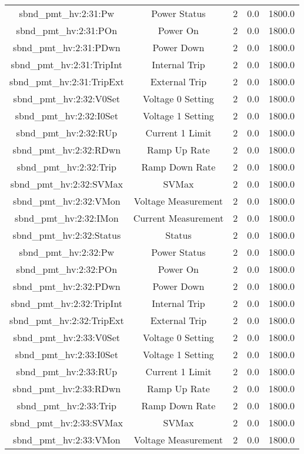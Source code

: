 \begin{table}[ptb]
\begin{tabular}{c | c c c c}
sbnd_pmt_hv:2:31:Pw & Power Status & 2 & 0.0 & 1800.0\\ 
sbnd_pmt_hv:2:31:POn & Power On & 2 & 0.0 & 1800.0\\ 
sbnd_pmt_hv:2:31:PDwn & Power Down & 2 & 0.0 & 1800.0\\ 
sbnd_pmt_hv:2:31:TripInt & Internal Trip & 2 & 0.0 & 1800.0\\ 
sbnd_pmt_hv:2:31:TripExt & External Trip & 2 & 0.0 & 1800.0\\ 
sbnd_pmt_hv:2:32:V0Set & Voltage 0 Setting & 2 & 0.0 & 1800.0\\ 
sbnd_pmt_hv:2:32:I0Set & Voltage 1 Setting & 2 & 0.0 & 1800.0\\ 
sbnd_pmt_hv:2:32:RUp & Current 1 Limit & 2 & 0.0 & 1800.0\\ 
sbnd_pmt_hv:2:32:RDwn & Ramp Up Rate & 2 & 0.0 & 1800.0\\ 
sbnd_pmt_hv:2:32:Trip & Ramp Down Rate & 2 & 0.0 & 1800.0\\ 
sbnd_pmt_hv:2:32:SVMax & SVMax & 2 & 0.0 & 1800.0\\ 
sbnd_pmt_hv:2:32:VMon & Voltage Measurement & 2 & 0.0 & 1800.0\\ 
sbnd_pmt_hv:2:32:IMon & Current Measurement & 2 & 0.0 & 1800.0\\ 
sbnd_pmt_hv:2:32:Status & Status & 2 & 0.0 & 1800.0\\ 
sbnd_pmt_hv:2:32:Pw & Power Status & 2 & 0.0 & 1800.0\\ 
sbnd_pmt_hv:2:32:POn & Power On & 2 & 0.0 & 1800.0\\ 
sbnd_pmt_hv:2:32:PDwn & Power Down & 2 & 0.0 & 1800.0\\ 
sbnd_pmt_hv:2:32:TripInt & Internal Trip & 2 & 0.0 & 1800.0\\ 
sbnd_pmt_hv:2:32:TripExt & External Trip & 2 & 0.0 & 1800.0\\ 
sbnd_pmt_hv:2:33:V0Set & Voltage 0 Setting & 2 & 0.0 & 1800.0\\ 
sbnd_pmt_hv:2:33:I0Set & Voltage 1 Setting & 2 & 0.0 & 1800.0\\ 
sbnd_pmt_hv:2:33:RUp & Current 1 Limit & 2 & 0.0 & 1800.0\\ 
sbnd_pmt_hv:2:33:RDwn & Ramp Up Rate & 2 & 0.0 & 1800.0\\ 
sbnd_pmt_hv:2:33:Trip & Ramp Down Rate & 2 & 0.0 & 1800.0\\ 
sbnd_pmt_hv:2:33:SVMax & SVMax & 2 & 0.0 & 1800.0\\ 
sbnd_pmt_hv:2:33:VMon & Voltage Measurement & 2 & 0.0 & 1800.0\\ 

\end{tabular}
\end{table}
